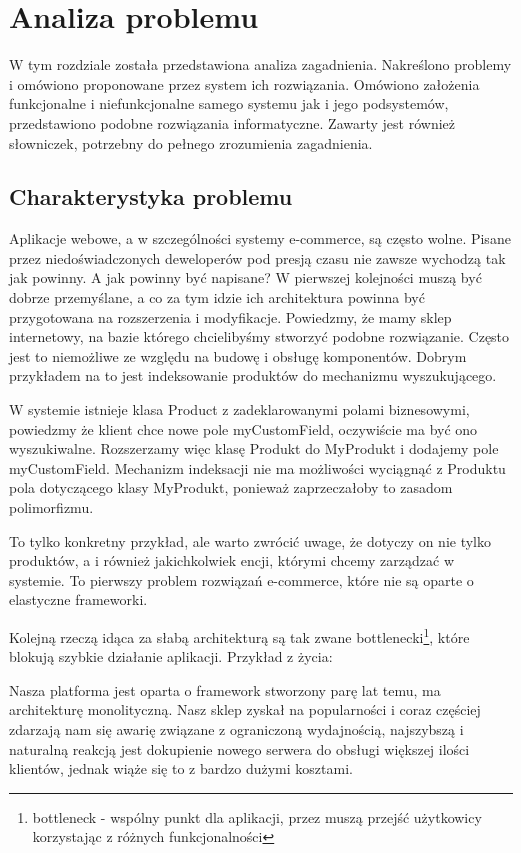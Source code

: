 \chapter{Analiza problemu}
\thispagestyle{chapterBeginStyle}
\label{rozdzial1}

W tym rozdziale została przedstawiona analiza zagadnienia. Nakreślono problemy i omówiono proponowane przez system ich rozwiązania. Omówiono założenia funkcjonalne i niefunkcjonalne samego systemu jak i jego podsystemów, przedstawiono podobne rozwiązania informatyczne. Zawarty jest również słowniczek, potrzebny do pełnego zrozumienia zagadnienia.


\section{Charakterystyka problemu}
Aplikacje webowe, a w szczególności systemy e-commerce, są często wolne. Pisane przez niedoświadczonych deweloperów pod presją czasu nie zawsze wychodzą tak jak powinny. A jak powinny być napisane? W pierwszej kolejności muszą być dobrze przemyślane, a co za tym idzie ich architektura powinna być przygotowana na rozszerzenia i modyfikacje. Powiedzmy, że mamy sklep internetowy, na bazie którego chcielibyśmy stworzyć podobne rozwiązanie. Często jest to niemożliwe ze względu na budowę i obsługę komponentów. Dobrym przykładem na to jest indeksowanie produktów do mechanizmu wyszukującego.
\begin{example}
	W systemie istnieje klasa Product z zadeklarowanymi polami biznesowymi, powiedzmy że klient chce nowe pole myCustomField, oczywiście ma być ono wyszukiwalne. Rozszerzamy więc klasę Produkt do MyProdukt i dodajemy pole myCustomField. Mechanizm indeksacji nie ma możliwości wyciągnąć z Produktu pola dotyczącego klasy MyProdukt, ponieważ zaprzeczałoby to zasadom polimorfizmu.
\end{example} 
To tylko konkretny przykład, ale warto zwrócić uwage, że dotyczy on nie tylko produktów, a i również jakichkolwiek encji, którymi chcemy zarządzać w systemie. To pierwszy problem rozwiązań e-commerce, które nie są oparte o elastyczne frameworki. 

Kolejną rzeczą idąca za słabą architekturą są tak zwane bottlenecki\footnote{bottleneck - wspólny punkt dla aplikacji, przez muszą przejść użytkowicy korzystając z różnych funkcjonalności}, które blokują szybkie działanie aplikacji. Przykład z życia: 
\begin{example}
	Nasza platforma jest oparta o framework stworzony parę lat temu, ma architekturę monolityczną. Nasz sklep zyskał na popularności i coraz częściej zdarzają nam się awarię związane z ograniczoną wydajnością, najszybszą i naturalną reakcją jest dokupienie nowego serwera do obsługi większej ilości klientów, jednak wiąże się to z bardzo dużymi kosztami.
\end{example} 

